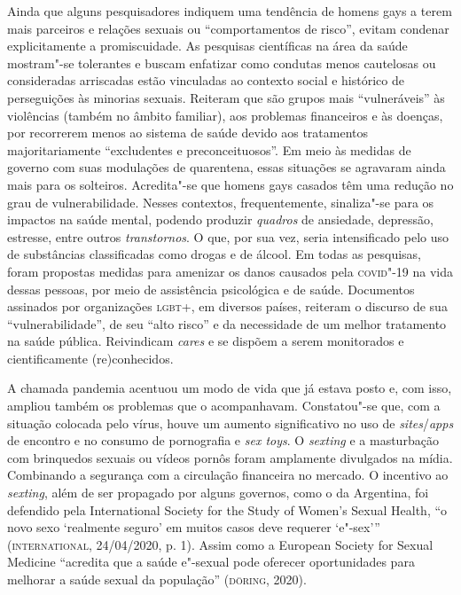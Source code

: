 Ainda que alguns pesquisadores indiquem uma tendência de homens gays a
terem mais parceiros e relações sexuais ou ``comportamentos de risco'',
evitam condenar explicitamente a promiscuidade. As pesquisas científicas
na área da saúde mostram"-se tolerantes e buscam enfatizar como condutas
menos cautelosas ou consideradas arriscadas estão vinculadas ao contexto
social e histórico de perseguições às minorias sexuais. Reiteram que são
grupos mais ``vulneráveis'' às violências (também no âmbito familiar),
aos problemas financeiros e às doenças, por recorrerem menos ao sistema
de saúde devido aos tratamentos majoritariamente ``excludentes e
preconceituosos''. Em meio às medidas de governo com suas modulações de
quarentena, essas situações se agravaram ainda mais para os solteiros.
Acredita"-se que homens gays casados têm uma redução no grau de
vulnerabilidade. Nesses contextos, frequentemente, sinaliza"-se para os
impactos na saúde mental, podendo produzir \emph{quadros} de ansiedade,
depressão, estresse, entre outros \emph{transtornos}. O que, por sua
vez, seria intensificado pelo uso de substâncias classificadas como
drogas e de álcool. Em todas as pesquisas, foram propostas medidas para
amenizar os danos causados pela \textsc{covid}"-19 na vida dessas pessoas, por
meio de assistência psicológica e de saúde. Documentos assinados por
organizações \textsc{lgbt}+, em diversos países, reiteram o discurso de sua
``vulnerabilidade'', de seu ``alto risco'' e da necessidade de um melhor
tratamento na saúde pública. Reivindicam \emph{cares} e se dispõem a
serem monitorados e cientificamente (re)conhecidos.

A chamada pandemia acentuou um modo de vida que já estava posto e, com
isso, ampliou também os problemas que o acompanhavam. Constatou"-se que,
com a situação colocada pelo vírus, houve um aumento significativo no
uso de \emph{sites}/\emph{apps} de encontro e no consumo de pornografia
e \emph{sex toys}. O \emph{sexting} e a masturbação com brinquedos
sexuais ou vídeos pornôs foram amplamente divulgados na mídia.
Combinando a segurança com a circulação financeira no mercado. O
incentivo ao \emph{sexting}, além de ser propagado por alguns governos,
como o da Argentina, foi defendido pela International Society for the
Study of Women's Sexual Health, ``o novo sexo `realmente seguro' em
muitos casos deve requerer `e"-sex''' (\textsc{international}, 24/04/2020, p. 1).
Assim como a European Society for Sexual Medicine ``acredita que a saúde
e"-sexual pode oferecer oportunidades para melhorar a saúde sexual da
população'' (\textsc{döring}, 2020).


